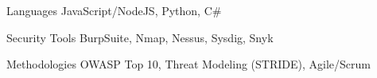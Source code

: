 

\begin{cvskills}

  \cvskill
    {Languages} %
    {JavaScript/NodeJS, Python, C\#} %

  \cvskill
    {Security Tools} %
    {BurpSuite, Nmap, Nessus, Sysdig, Snyk} %

  \cvskill
    {Methodologies}
    {OWASP Top 10, Threat Modeling (STRIDE), Agile/Scrum}

\end{cvskills}

